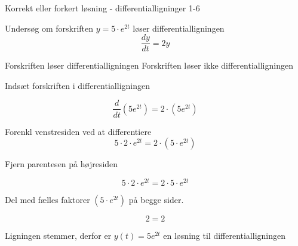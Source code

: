\documentclass{article}
\begin{document}
\begin{exercise}{Korrekt eller forkert løsning - differentialligninger 1-6}


Undersøg om forskriften $y = 5 \cdot e^{2t}$ løser differentialligningen
\[
\frac{dy}{dt} = 2y
\]

\begin{multichoice}
\itemtrue Forskriften løser differentialligningen
\itemfalse Forskriften løser ikke differentialligningen
\end{multichoice}

\hint

Indsæt forskriften i differentialligningen

\hint
\[
\frac{d}{dt} \left( 5 e^{2t}\right) = 2 \cdot \left( 5 e^{2t} \right)
\]


\hint

Forenkl venstresiden ved at differentiere
\[
5 \cdot 2 \cdot e^{2t} = 2 \cdot \left(5 \cdot e^{2t} \right)
\]

\hint

Fjern parentesen på højresiden

\hint
\[
5 \cdot 2 \cdot e^{2t} = 2 \cdot 5 \cdot e^{2t}
\]

\hint
Del med fælles faktorer $\left( 5 \cdot e^{2t} \right)$ på begge sider.

\hint

\[
2 = 2
\]


\hint

Ligningen stemmer, derfor er $y(t) = 5 e^{2t}$ en løsning til differentialligningen

\end{exercise}

\newpage
\end{document}

